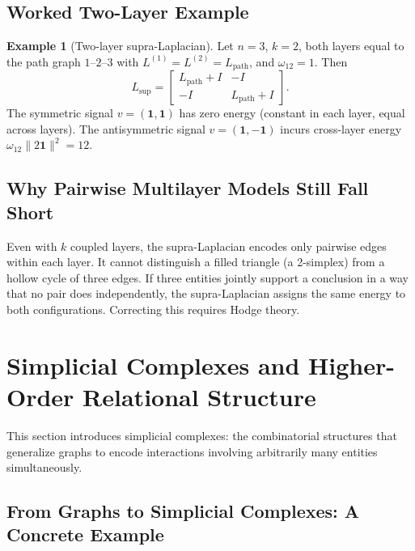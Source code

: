 \documentclass[11pt]{article}
\theoremstyle{definition}
\newtheorem{example}[theorem]{Example}
\theoremstyle{remark}
\newcommand{\Lsup}{L_{\mathrm{sup}}}
\begin{document}
\subsection{Worked Two-Layer Example}

\begin{example}[Two-layer supra-Laplacian]
\label{ex:supra}
Let $n=3$, $k=2$, both layers equal to the path graph $1$--$2$--$3$ with
$L^{(1)}=L^{(2)}=L_{\mathrm{path}}$, and $\omega_{12}=1$. Then
\[
  \Lsup = \begin{bmatrix} L_{\mathrm{path}}+I & -I \\ -I & L_{\mathrm{path}}+I \end{bmatrix}.
\]
The symmetric signal $v=(\mathbf{1},\mathbf{1})$ has zero energy (constant in
each layer, equal across layers). The antisymmetric signal
$v=(\mathbf{1},-\mathbf{1})$ incurs cross-layer energy
$\omega_{12}\|2\mathbf{1}\|^2=12$.
\end{example}

\subsection{Why Pairwise Multilayer Models Still Fall Short}

Even with $k$ coupled layers, the supra-Laplacian encodes only pairwise edges
within each layer. It cannot distinguish a filled triangle (a 2-simplex) from a
hollow cycle of three edges. If three entities jointly support a conclusion in a
way that no pair does independently, the supra-Laplacian assigns the same energy
to both configurations. Correcting this requires Hodge theory.


\section{Simplicial Complexes and Higher-Order Relational Structure}
\label{sec:simplicial}

This section introduces simplicial complexes: the combinatorial structures that
generalize graphs to encode interactions involving arbitrarily many entities
simultaneously.

\subsection{From Graphs to Simplicial Complexes: A Concrete Example}
\end{document}
